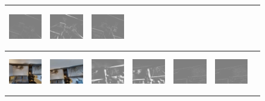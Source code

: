 \documentclass[letterpaper, 10 pt, conference]{ieeeconf}  %
\begin{document}
\begin{figure}[h!]
\begin{center}
\begin{tabular}{|c| c |c | c | c | c | c|}
 \includegraphics[width=18mm, height=17mm]{TrueDepth/ARKANSAW/ferror.png} &
  \includegraphics[width=18mm, height=17mm]{DepthNetwork/ARKANSAW/ferror.png} &
    \includegraphics[width=18mm, height=17mm]{FlowDepth/ARKANSAW/ferror.png}
 \\ \hline
 \includegraphics[width=18mm, height=17mm]{TrueDepth/PABLO/init.png} &   
            \includegraphics[width=18mm, height=17mm]{TrueDepth/PABLO/des.png} & 
           \includegraphics[width=18mm, height=17mm]{PhotoVS/PABLO/ferror.png} & 
           \includegraphics[width=18mm, height=17mm]{ICRA17/PABLO/ferror.png} & 
 \includegraphics[width=18mm, height=17mm]{TrueDepth/PABLO/ferror.png} &
 \includegraphics[width=18mm, height=17mm]{DepthNetwork/PABLO/ferror.png} &

\end{tabular}
\end{center}
\end{figure}
\end{document}
